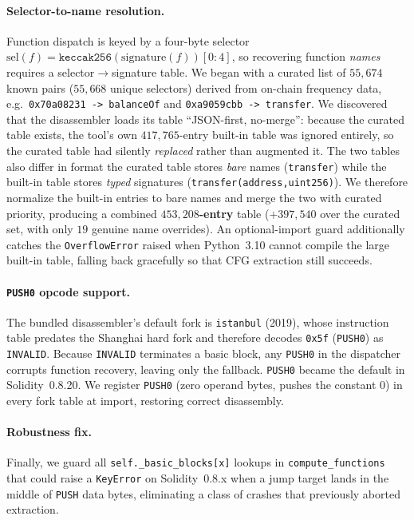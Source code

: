\documentclass{article}
\begin{document}
\paragraph{Selector-to-name resolution.}
Function dispatch is keyed by a four-byte selector
$\mathrm{sel}(f)=\texttt{keccak256}(\text{signature}(f))[0{:}4]$, so recovering
function \emph{names} requires a selector$\rightarrow$signature table. We began
with a curated list of $55{,}674$ known pairs ($55{,}668$ unique selectors)
derived from on-chain frequency data, e.g.\
\verb|0x70a08231 -> balanceOf| and \verb|0xa9059cbb -> transfer|. We discovered
that the disassembler loads its table ``JSON-first, no-merge'': because the
curated table exists, the tool's own $417{,}765$-entry built-in table was ignored
entirely, so the curated table had silently \emph{replaced} rather than augmented
it. The two tables also differ in format the curated table stores \emph{bare}
names (\texttt{transfer}) while the built-in table stores \emph{typed} signatures
(\texttt{transfer(address,uint256)}). We therefore normalize the built-in entries
to bare names and merge the two with curated priority, producing a combined
\textbf{$453{,}208$-entry} table ($+397{,}540$ over the curated set, with only $19$
genuine name overrides). An optional-import guard additionally catches the
\texttt{OverflowError} raised when Python~3.10 cannot compile the large built-in
table, falling back gracefully so that CFG extraction still succeeds.

\paragraph{\texttt{PUSH0} opcode support.}
The bundled disassembler's default fork is \texttt{istanbul} (2019), whose
instruction table predates the Shanghai hard fork and therefore decodes
\verb|0x5f| (\texttt{PUSH0}) as \texttt{INVALID}. Because \texttt{INVALID}
terminates a basic block, any \texttt{PUSH0} in the dispatcher corrupts function
recovery, leaving only the fallback. \texttt{PUSH0} became the default in
Solidity~0.8.20. We register \texttt{PUSH0} (zero operand bytes, pushes the
constant $0$) in every fork table at import, restoring correct disassembly.

\paragraph{Robustness fix.}
Finally, we guard all \texttt{self.\_basic\_blocks[x]} lookups in
\texttt{compute\_functions} that could raise a \texttt{KeyError} on
Solidity~0.8.x when a jump target lands in the middle of \texttt{PUSH} data bytes,
eliminating a class of crashes that previously aborted extraction.
\end{document}

